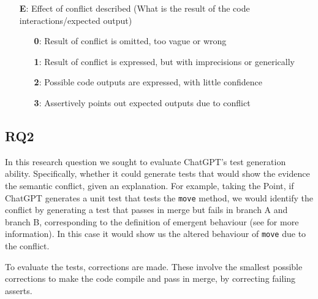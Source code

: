 \begin{itemize}
  \item[\textbf{E}:] Effect of conflict described (What is the result of the code interactions/expected output)
  \begin{itemize}
    \item[\textbf{0}:] Result of conflict is omitted, too vague or wrong
    \item[\textbf{1}:] Result of conflict is expressed, but with imprecisions or generically
    \item[\textbf{2}:] Possible code outputs are expressed, with little confidence
    \item[\textbf{3}:] Assertively points out expected outputs due to conflict
  \end{itemize}
\end{itemize}


\subsection{RQ2}

In this research question we sought to evaluate ChatGPT's test generation ability. Specifically, whether it could generate tests that would show the evidence the semantic conflict, given an explanation.
For example, taking the Point, if ChatGPT generates a unit test that tests the \texttt{move} method, we would identify the conflict by generating a test that passes in merge but fails in branch A and branch B, corresponding to the definition of emergent behaviour (see \citet{kn:nuno} for more information).
In this case it would show us the altered behaviour of \texttt{move} due to the conflict.

To evaluate the tests, corrections are made. These involve the smallest possible corrections to make the code compile and pass in merge, by correcting failing asserts.

